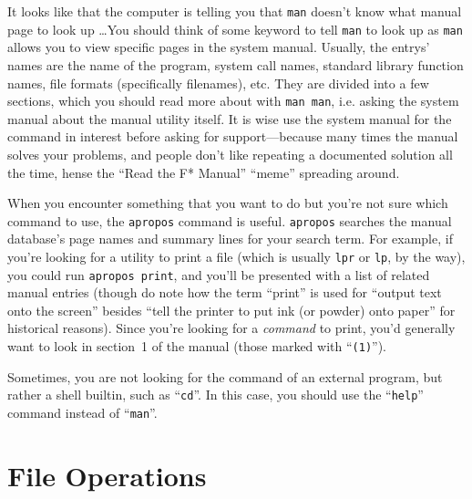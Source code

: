 \documentclass{extbook}
\begin{document}
It looks like that the computer is telling you that \verb|man| doesn't know what manual page to look up \ldots You should think of some keyword to tell \verb|man| to look up as \verb|man| allows you to view specific pages in the system manual.  Usually, the entrys' names are the name of the program, system call names, standard library function names, file formats (specifically filenames), etc.  They are divided into a few sections, which you should read more about with \verb|man man|, i.e. asking the system manual about the manual utility itself.  It is wise use the system manual for the command in interest before asking for support---because many times the manual solves your problems, and people don't like repeating a documented solution all the time, hense the ``Read the F* Manual'' ``meme'' spreading around.

When you encounter something that you want to do but you're not sure which command to use, the \verb|apropos| command is useful.  \verb|apropos| searches the manual database's page names and summary lines for your search term.  For example, if you're looking for a utility to print a file (which is usually \verb|lpr| or \verb|lp|, by the way), you could run \verb|apropos print|, and you'll be presented with a list of related manual entries (though do note how the term ``print'' is used for ``output text onto the screen'' besides ``tell the printer to put ink (or powder) onto paper'' for historical reasons).  Since you're looking for a \emph{command} to print, you'd generally want to look in section~1 of the manual (those marked with ``\verb|(1)|'').

Sometimes, you are not looking for the command of an external program, but rather a shell builtin, such as ``\verb|cd|''.  In this case, you should use the ``\verb|help|'' command instead of ``\verb|man|''.


\section{File Operations}
\end{document}
